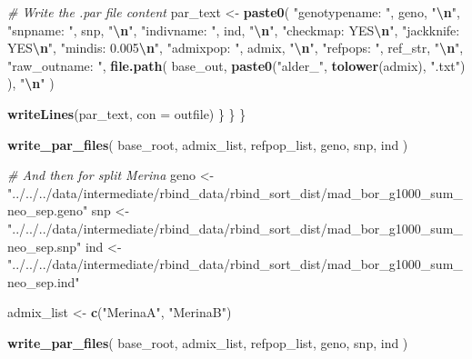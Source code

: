 \documentclass[
]{article}
\newenvironment{Shaded}{\begin{snugshade}}{\end{snugshade}}
\newcommand{\AttributeTok}[1]{\textcolor[rgb]{0.13,0.29,0.53}{#1}}
\newcommand{\CommentTok}[1]{\textcolor[rgb]{0.56,0.35,0.01}{\textit{#1}}}
\newcommand{\FunctionTok}[1]{\textcolor[rgb]{0.13,0.29,0.53}{\textbf{#1}}}
\newcommand{\NormalTok}[1]{#1}
\newcommand{\OtherTok}[1]{\textcolor[rgb]{0.56,0.35,0.01}{#1}}
\newcommand{\SpecialCharTok}[1]{\textcolor[rgb]{0.81,0.36,0.00}{\textbf{#1}}}
\newcommand{\StringTok}[1]{\textcolor[rgb]{0.31,0.60,0.02}{#1}}
\begin{document}
\begin{Shaded}
\begin{Highlighting}[]
      \CommentTok{\# Write the .par file content}
\NormalTok{      par\_text }\OtherTok{\textless{}{-}} \FunctionTok{paste0}\NormalTok{(}
        \StringTok{"genotypename: "}\NormalTok{, geno, }\StringTok{"}\SpecialCharTok{\textbackslash{}n}\StringTok{"}\NormalTok{,}
        \StringTok{"snpname: "}\NormalTok{, snp, }\StringTok{"}\SpecialCharTok{\textbackslash{}n}\StringTok{"}\NormalTok{,}
        \StringTok{"indivname: "}\NormalTok{, ind, }\StringTok{"}\SpecialCharTok{\textbackslash{}n}\StringTok{"}\NormalTok{,}
        \StringTok{"checkmap: YES}\SpecialCharTok{\textbackslash{}n}\StringTok{"}\NormalTok{,}
        \StringTok{"jackknife: YES}\SpecialCharTok{\textbackslash{}n}\StringTok{"}\NormalTok{,}
        \StringTok{"mindis: 0.005}\SpecialCharTok{\textbackslash{}n}\StringTok{"}\NormalTok{,}
        \StringTok{"admixpop: "}\NormalTok{, admix, }\StringTok{"}\SpecialCharTok{\textbackslash{}n}\StringTok{"}\NormalTok{,}
        \StringTok{"refpops: "}\NormalTok{, ref\_str, }\StringTok{"}\SpecialCharTok{\textbackslash{}n}\StringTok{"}\NormalTok{,}
        \StringTok{"raw\_outname: "}\NormalTok{, }\FunctionTok{file.path}\NormalTok{(}
\NormalTok{          base\_out,}
          \FunctionTok{paste0}\NormalTok{(}\StringTok{"alder\_"}\NormalTok{, }\FunctionTok{tolower}\NormalTok{(admix), }\StringTok{".txt"}\NormalTok{)}
\NormalTok{        ), }\StringTok{"}\SpecialCharTok{\textbackslash{}n}\StringTok{"}
\NormalTok{      )}

      \FunctionTok{writeLines}\NormalTok{(par\_text, }\AttributeTok{con =}\NormalTok{ outfile)}
\NormalTok{    \}}
\NormalTok{  \}}
\NormalTok{\}}

\FunctionTok{write\_par\_files}\NormalTok{(}
\NormalTok{  base\_root,}
\NormalTok{  admix\_list,}
\NormalTok{  refpop\_list,}
\NormalTok{  geno,}
\NormalTok{  snp,}
\NormalTok{  ind}
\NormalTok{)}

\CommentTok{\# And then for split Merina}
\NormalTok{geno }\OtherTok{\textless{}{-}} \StringTok{"../../../data/intermediate/rbind\_data/rbind\_sort\_dist/mad\_bor\_g1000\_sum\_neo\_sep.geno"}
\NormalTok{snp }\OtherTok{\textless{}{-}} \StringTok{"../../../data/intermediate/rbind\_data/rbind\_sort\_dist/mad\_bor\_g1000\_sum\_neo\_sep.snp"}
\NormalTok{ind }\OtherTok{\textless{}{-}} \StringTok{"../../../data/intermediate/rbind\_data/rbind\_sort\_dist/mad\_bor\_g1000\_sum\_neo\_sep.ind"}

\NormalTok{admix\_list }\OtherTok{\textless{}{-}} \FunctionTok{c}\NormalTok{(}\StringTok{"MerinaA"}\NormalTok{, }\StringTok{"MerinaB"}\NormalTok{)}

\FunctionTok{write\_par\_files}\NormalTok{(}
\NormalTok{  base\_root,}
\NormalTok{  admix\_list,}
\NormalTok{  refpop\_list,}
\NormalTok{  geno,}
\NormalTok{  snp,}
\NormalTok{  ind}
\NormalTok{)}
\end{Highlighting}
\end{Shaded}
\end{document}
